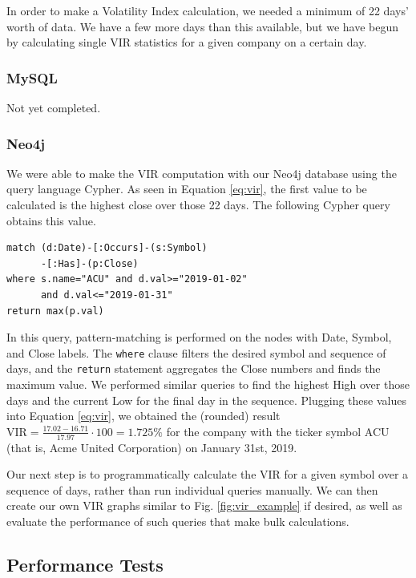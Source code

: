 \documentclass{IEEEtran}
\begin{document}
In order to make a Volatility Index calculation, we needed a minimum of 22 days' worth of data. We have a few more days than this available, but we have begun by calculating single VIR statistics for a given company on a certain day. 

\subsubsection{MySQL}

Not yet completed.

\subsubsection{Neo4j}

We were able to make the VIR computation with our Neo4j database using the query language Cypher. As seen in Equation \ref{eq:vir}, the first value to be calculated is the highest close over those 22 days. The following Cypher query obtains this value.
\begin{verbatim}
match (d:Date)-[:Occurs]-(s:Symbol)
      -[:Has]-(p:Close)  
where s.name="ACU" and d.val>="2019-01-02" 
      and d.val<="2019-01-31" 
return max(p.val) 
\end{verbatim} 

In this query, pattern-matching is performed on the nodes with Date, Symbol, and Close labels. The \texttt{where} clause filters the desired symbol and sequence of days, and the \texttt{return} statement aggregates the Close numbers and finds the maximum value. We performed similar queries to find the highest High over those days and the current Low for the final day in the sequence. Plugging these values into Equation \ref{eq:vir}, we obtained the (rounded) result $\text{VIR} = \frac{17.02 - 16.71}{17.97}\cdot 100 = 1.725\%$ for the company with the ticker symbol ACU (that is, Acme United Corporation) on January 31st, 2019.  

Our next step is to programmatically calculate the VIR for a given symbol over a sequence of days, rather than run individual queries manually. We can then create our own VIR graphs similar to Fig. \ref{fig:vir_example} if desired, as well as evaluate the performance of such queries that make bulk calculations. 

\subsection{Performance Tests}
\end{document}
